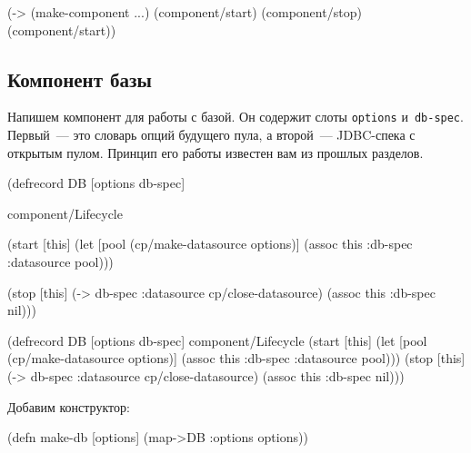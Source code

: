 \begin{english}
  \begin{clojure}
(-> (make-component {...})
    (component/start)
    (component/stop)
    (component/start))
  \end{clojure}
\end{english}


\subsection{Компонент базы}

Напишем компонент для работы с базой. Он содержит слоты \verb|options|
и~\verb|db-spec|. Первый~--- это словарь опций будущего пула, а второй~---
JDBC-спека с открытым пулом. Принцип его работы известен вам из прошлых
разделов.

\ifnarrow

\begin{english}
  \begin{clojure}
(defrecord DB [options db-spec]

  component/Lifecycle

  (start [this]
    (let [pool (cp/make-datasource
                 options)]
      (assoc this :db-spec
        {:datasource pool})))

  (stop [this]
    (-> db-spec
        :datasource
        cp/close-datasource)
    (assoc this :db-spec nil)))
  \end{clojure}
\end{english}

\else

\begin{english}
  \begin{clojure}
(defrecord DB [options db-spec]
  component/Lifecycle
  (start [this]
    (let [pool (cp/make-datasource options)]
      (assoc this :db-spec {:datasource pool})))
  (stop [this]
    (-> db-spec :datasource cp/close-datasource)
    (assoc this :db-spec nil)))
  \end{clojure}
\end{english}

\fi

\noindent
Добавим конструктор:

\begin{english}
  \begin{clojure}
(defn make-db [options]
  (map->DB {:options options}))
  \end{clojure}
\end{english}

